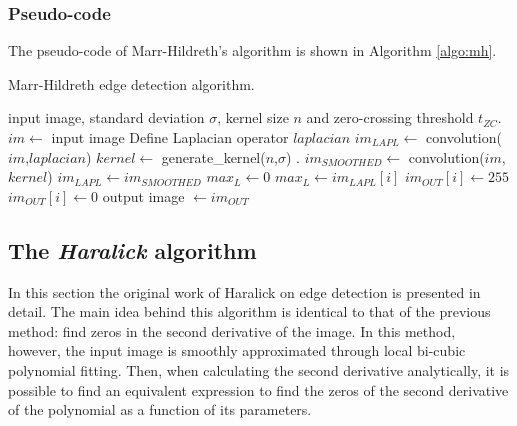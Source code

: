 \documentclass{ipol}
\numberwithin{equation}{section}
\numberwithin{table}{section}
\begin{document}
\subsubsection{Pseudo-code}

The pseudo-code of Marr-Hildreth's algorithm is shown in Algorithm \ref{algo:mh}.

\begin{algorithm}[t!]
\caption{Marr-Hildreth edge detection algorithm.}
\label{algo:mh}
\begin{algorithmic}[1]
\REQUIRE input image, standard deviation $\sigma$, kernel size $n$ and zero-crossing threshold $t_{ZC}$.
\STATE $im \leftarrow$ input image
	\STATE Define Laplacian operator $laplacian$
	\STATE $im_{LAPL} \leftarrow$ convolution($im$,$laplacian$)
\ELSE
	\STATE $kernel \leftarrow$ generate\_kernel($n$,$\sigma$) .
	\STATE $im_{SMOOTHED} \leftarrow$ convolution($im$,$kernel$)
	\STATE $im_{LAPL} \leftarrow im_{SMOOTHED}$
\ENDIF
\STATE $max_L \leftarrow 0$
		\STATE $max_L \leftarrow im_{LAPL}[i]$
	\ENDIF
\ENDFOR
{}
			\STATE $im_{OUT}[i] \leftarrow 255$
		\ELSE
			\STATE $im_{OUT}[i] \leftarrow 0$
		\ENDIF
	\ENDFOR
\ENDFOR
\RETURN output image $\leftarrow im_{OUT}$
\end{algorithmic}
\end{algorithm}


\subsection{The \textit{Haralick} algorithm}

In this section the original work of Haralick \cite{bb20239} on edge detection is presented in detail.
The main idea behind this algorithm is identical to that of the previous method: find zeros in 
the second derivative of the image. In this method, however, the input image is smoothly approximated through local bi-cubic
polynomial fitting. Then, when calculating the second derivative analytically, it is possible to find 
an equivalent expression to find the zeros of the second derivative of the polynomial as a function of 
its parameters.%
\end{document}
